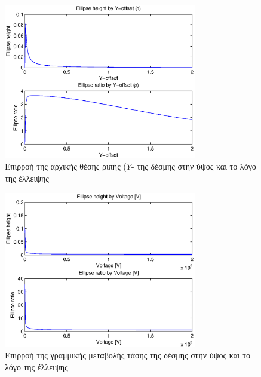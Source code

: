 \begin{figure}[tbh]
\includegraphics[width=0.75\textwidth]{figures/beam_deflection_script_05_elipse_ratio_by_bunch_intensity}
\centering
\caption{Επιρροή της αρχικής θέσης ριπής ($Y$- της δέσμης στην ύψος και το λόγο της έλλειψης}
\label{fig:beam_deflection_script_05_elipse_ratio_by_bunch_intensity}
\end{figure}

\begin{figure}[tbh]
\includegraphics[width=0.75\textwidth]{figures/beam_deflection_script_06}
\centering
\caption{Επιρροή της γραμμικής μεταβολής τάσης της δέσμης στην ύψος και το λόγο της έλλειψης}
\label{fig:beam_deflection_script_06}
\end{figure}

